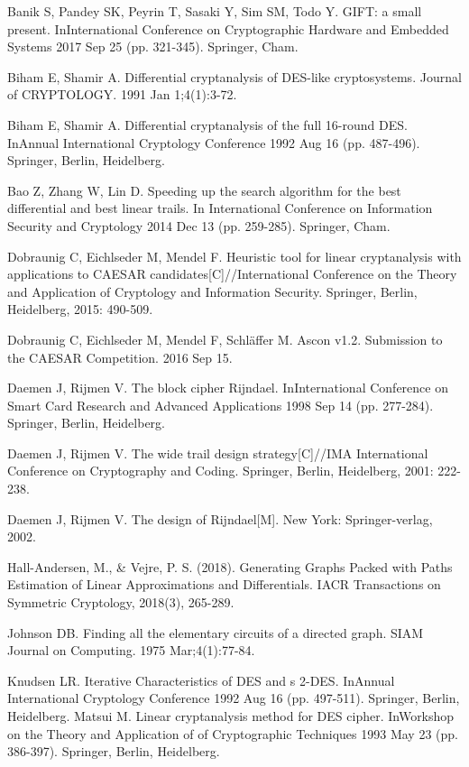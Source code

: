 Banik S, Pandey SK, Peyrin T, Sasaki Y, Sim SM, Todo Y. GIFT: a small present. InInternational Conference on Cryptographic Hardware and Embedded Systems 2017 Sep 25 (pp. 321-345). Springer, Cham.

Biham E, Shamir A. Differential cryptanalysis of DES-like cryptosystems. Journal of CRYPTOLOGY. 1991 Jan 1;4(1):3-72.

Biham E, Shamir A. Differential cryptanalysis of the full 16-round DES. InAnnual International Cryptology Conference 1992 Aug 16 (pp. 487-496). Springer, Berlin, Heidelberg.

Bao Z, Zhang W, Lin D. Speeding up the search algorithm for the best differential and best linear trails. In International Conference on Information Security and Cryptology 2014 Dec 13 (pp. 259-285). Springer, Cham.

Dobraunig C, Eichlseder M, Mendel F. Heuristic tool for linear cryptanalysis with applications to CAESAR candidates[C]//International Conference on the Theory and Application of Cryptology and Information Security. Springer, Berlin, Heidelberg, 2015: 490-509.

Dobraunig C, Eichlseder M, Mendel F, Schläffer M. Ascon v1.2. Submission to the CAESAR Competition. 2016 Sep 15.

Daemen J, Rijmen V. The block cipher Rijndael. InInternational Conference on Smart Card Research and Advanced Applications 1998 Sep 14 (pp. 277-284). Springer, Berlin, Heidelberg.

Daemen J, Rijmen V. The wide trail design strategy[C]//IMA International Conference on Cryptography and Coding. Springer, Berlin, Heidelberg, 2001: 222-238.

Daemen J, Rijmen V. The design of Rijndael[M]. New York: Springer-verlag, 2002.

Hall-Andersen, M., \& Vejre, P. S. (2018). Generating Graphs Packed with Paths Estimation of Linear Approximations and Differentials. IACR Transactions on Symmetric Cryptology, 2018(3), 265-289.

Johnson DB. Finding all the elementary circuits of a directed graph. SIAM Journal on Computing. 1975 Mar;4(1):77-84.

Knudsen LR. Iterative Characteristics of DES and s 2-DES. InAnnual International Cryptology Conference 1992 Aug 16 (pp. 497-511). Springer, Berlin, Heidelberg.
Matsui M. Linear cryptanalysis method for DES cipher. InWorkshop on the Theory and Application of of Cryptographic Techniques 1993 May 23 (pp. 386-397). Springer, Berlin, Heidelberg.

